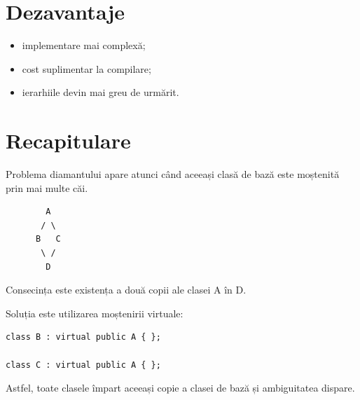 \documentclass[12pt,a4paper]{article}
\begin{document}
\section{Dezavantaje}

\begin{itemize}
\item implementare mai complexă;
\item cost suplimentar la compilare;
\item ierarhiile devin mai greu de urmărit.
\end{itemize}

\section{Recapitulare}

Problema diamantului apare atunci când aceeași clasă de bază este moștenită prin mai multe căi.

\begin{verbatim}
        A
       / \
      B   C
       \ /
        D
\end{verbatim}

Consecința este existența a două copii ale clasei A în D.

Soluția este utilizarea moștenirii virtuale:

\begin{verbatim}
class B : virtual public A { };

class C : virtual public A { };
\end{verbatim}

Astfel, toate clasele împart aceeași copie a clasei de bază și ambiguitatea dispare.
\end{document}
